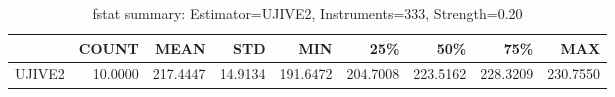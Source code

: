 \begin{table}[ht]
\centering
\caption{fstat summary: Estimator=UJIVE2, Instruments=333, Strength=0.20}
\begin{tabular}{lrrrrrrrr}
\toprule
 & COUNT & MEAN & STD & MIN & 25\% & 50\% & 75\% & MAX \\
\midrule
UJIVE2 & 10.0000 & 217.4447 & 14.9134 & 191.6472 & 204.7008 & 223.5162 & 228.3209 & 230.7550 \\
\bottomrule
\end{tabular}
\end{table}
